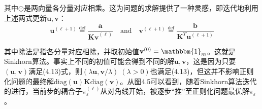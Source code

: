 \documentclass[cn,10pt,math=newtx,citestyle=gb7714-2015,bibstyle=gb7714-2015]{elegantbook}
\begin{document}
其中$\odot$是两向量各分量对应相乘。这为问题的求解提供了一种灵感，即迭代地利用上述两式更新$\mathbf{u,v}$：
\begin{equation}
    \label{4.15}
    \mathbf{u}^{(\ell+1)} \overset{\text{def}}{=} \frac{\mathbf{a}}{\mathbf{Kv}^{(\ell)}} \quad \text{and} \quad \mathbf{v}^{(\ell+1)} \overset{\text{def}}{=} \frac{\mathbf{b}}{\mathbf{K}^T\mathbf{u}^{(\ell+1)}}
\end{equation}

其中除法是指各分量对应相除，并取初始值$\mathbf{v}^{(0)}=\mathbbm{1}_m$。这就是Sinkhorn算法。事实上不同的初值可能会得到不同的解$\mathbf{u,v}$，这是因为只要$(\mathbf{u,v})$满足(4.13)式，则$(\lambda \mathbf{u}, \mathbf{v}/\lambda)\;(\lambda>0)$也满足(4.13)，但这并不影响正则化问题的最终解$\text{diag}(\mathbf{u})\mathbf{K}\text{diag}(\mathbf{v})$。从图4.5可以看到，随着Sinkhorn算法迭代的进行，当前步的耦合子$\pi_\varepsilon^{(\ell)}$从对角线开始，被逐步“推”至正则化问题最优解$\pi_\varepsilon$。
\end{document}

